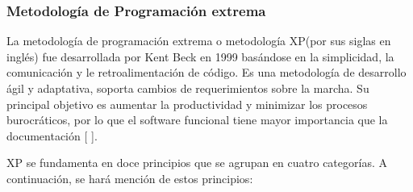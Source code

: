 \subsubsection{Metodología de Programación extrema}
La metodología de programación extrema o metodología XP(por sus siglas en inglés) fue desarrollada por Kent Beck en 1999 basándose en la simplicidad, la comunicación y le retroalimentación de código. Es una metodología de desarrollo ágil y adaptativa, soporta cambios de requerimientos sobre la marcha. Su principal objetivo es aumentar la productividad y minimizar los procesos burocráticos, por lo que el software funcional tiene mayor importancia que la documentación [ ].
\\
\par
  XP se fundamenta en doce principios que se agrupan en cuatro categorías. A continuación, se hará mención de estos principios:
